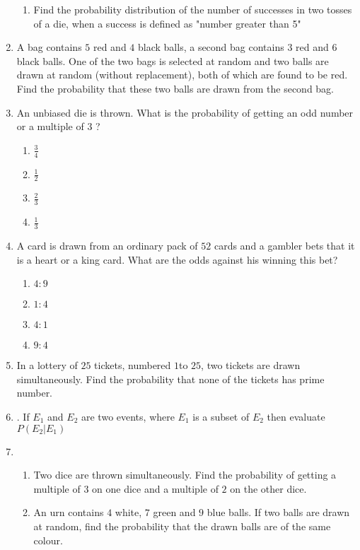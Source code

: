 \documentclass{article}
\begin{document}
\begin{enumerate}
\begin{enumerate}
			\item Find the probability distribution of the number of successes in two tosses of a die, when a success is defined as "number greater than 5"
				\end{enumerate}
			\item A bag contains $5$ red and $4$ black balls, a second bag contains $3$ red and $6$ black balls. One of the two bags is selected at random and two balls are drawn at random (without replacement), both of which are found to be red. Find the probability that these two balls are drawn from the second bag.
		\item An unbiased die is thrown. What is the probability of getting an odd number or a multiple of $3$ ?
		\begin{enumerate}%
			\item $\frac{3}{4}$
				\item $\frac{1}{2}$
                		\item $\frac{2}{3}$
                		\item $\frac{1}{3}$
                        \end{enumerate}
		\item A card is drawn from an ordinary pack of $52$ cards and a gambler bets that it is a heart or a king card. What are the odds against his winning this bet?
			\begin{enumerate}%
				\item $4:9$
				\item $1:4$
				\item $4:1$
				\item $9:4$
			\end{enumerate}
		\item In a lottery of $25$ tickets, numbered $1 $to $25$, two tickets are drawn simultaneously. Find the probability that none of the tickets has prime number.
		\item . If {$E_{1}$} and {$E_{2}$} are two events, where {$E_{1}$} is a subset of {$E_{2}$} then evaluate {$P( E_{2} |E_{1} )$}
		\item \begin{enumerate}%
				\item Two dice are thrown simultaneously. Find the probability of getting a multiple of $3$ on one dice and a multiple of $2$ on the other dice.
				\item An urn contains $4$ white, $7$ green and $9$ blue balls. If two balls are drawn at random, find the probability that the drawn balls are of the same colour.
		\end{enumerate}

\end{enumerate}
\end{document}
